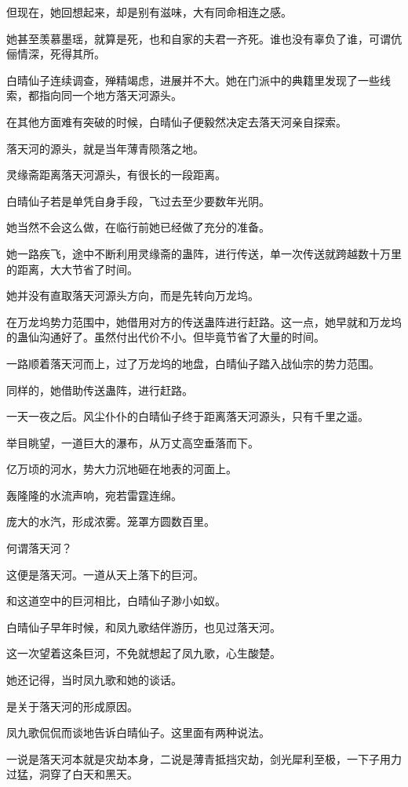 \begin{this_body}
但现在，她回想起来，却是别有滋味，大有同命相连之感。

她甚至羡慕墨瑶，就算是死，也和自家的夫君一齐死。谁也没有辜负了谁，可谓伉俪情深，死得其所。

白晴仙子连续调查，殚精竭虑，进展并不大。她在门派中的典籍里发现了一些线索，都指向同一个地方落天河源头。

在其他方面难有突破的时候，白晴仙子便毅然决定去落天河亲自探索。

落天河的源头，就是当年薄青陨落之地。

灵缘斋距离落天河源头，有很长的一段距离。

白晴仙子若是单凭自身手段，飞过去至少要数年光阴。

她当然不会这么做，在临行前她已经做了充分的准备。

她一路疾飞，途中不断利用灵缘斋的蛊阵，进行传送，单一次传送就跨越数十万里的距离，大大节省了时间。

她并没有直取落天河源头方向，而是先转向万龙坞。

在万龙坞势力范围中，她借用对方的传送蛊阵进行赶路。这一点，她早就和万龙坞的蛊仙沟通好了。虽然付出代价不小。但毕竟节省了大量的时间。

一路顺着落天河而上，过了万龙坞的地盘，白晴仙子踏入战仙宗的势力范围。

同样的，她借助传送蛊阵，进行赶路。

一天一夜之后。风尘仆仆的白晴仙子终于距离落天河源头，只有千里之遥。

举目眺望，一道巨大的瀑布，从万丈高空垂落而下。

亿万顷的河水，势大力沉地砸在地表的河面上。

轰隆隆的水流声响，宛若雷霆连绵。

庞大的水汽，形成浓雾。笼罩方圆数百里。

何谓落天河？

这便是落天河。一道从天上落下的巨河。

和这道空中的巨河相比，白晴仙子渺小如蚁。

白晴仙子早年时候，和凤九歌结伴游历，也见过落天河。

这一次望着这条巨河，不免就想起了凤九歌，心生酸楚。

她还记得，当时凤九歌和她的谈话。

是关于落天河的形成原因。

凤九歌侃侃而谈地告诉白晴仙子。这里面有两种说法。

一说是落天河本就是灾劫本身，二说是薄青抵挡灾劫，剑光犀利至极，一下子用力过猛，洞穿了白天和黑天。


\end{this_body}
